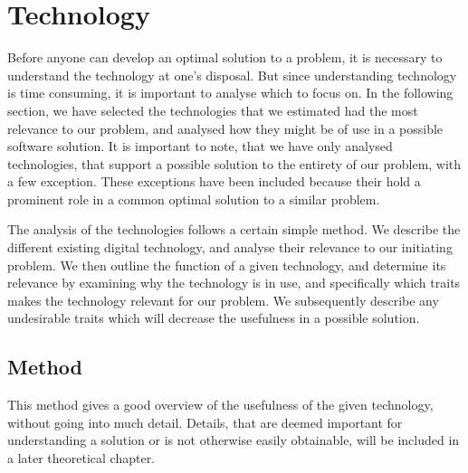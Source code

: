 
\section{Technology} \label{tech}


Before anyone can develop an optimal solution to a problem, it is necessary to understand the technology at one's disposal. But since understanding technology is time consuming, it is important to analyse which to focus on. In the following section, we have selected the technologies that we estimated had the most relevance to our problem, and analysed how they might be of use in a possible software solution. It is important to note, that we have only analysed technologies, that support a possible solution to the entirety of our problem, with a few exception. These exceptions have been included because their hold a prominent role in a common optimal solution to a similar problem.

The analysis of the technologies follows a certain simple method. We describe the different existing digital technology, and analyse their relevance to our initiating problem. We then outline the function of a given technology, and determine its relevance by examining why the technology is in use, and specifically which traits makes the technology relevant for our problem. We subsequently describe any undesirable traits which will decrease the usefulness in a possible solution.

\subsection{Method} \label{sub:techmethod}
This method gives a good overview of the usefulness of the given technology, without going into much detail. Details, that are deemed important for understanding a solution or is not otherwise easily obtainable, will be included in a later theoretical chapter.




